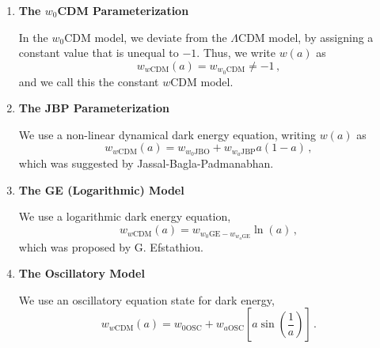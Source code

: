 \documentclass{book}
\begin{document}
	\begin{enumerate}
		\item \textbf{The $w_0$CDM Parameterization}
		
		In the $w_0$CDM model, we deviate from the $\Lambda$CDM model, by assigning a constant value that is unequal to $-1$. Thus, we write $w(a)$ as
		\begin{equation}
			w_{w\text{CDM}}(a)=w_{w_0\text{CDM}}\neq -1 \, ,
		\end{equation}
		and we call this the constant $w$CDM model.
		\item \textbf{The JBP Parameterization}
		
		We use a non-linear dynamical dark energy equation, writing $w(a)$ as
		\begin{equation}
			w_{w\text{CDM}}(a)=w_{w_0\text{JBO}}+w_{w_a\text{JBP}}a(1-a) \, ,
		\end{equation}
		which was suggested by Jassal-Bagla-Padmanabhan.
		\item \textbf{The GE (Logarithmic) Model}
		
		We use a logarithmic dark energy equation,
		\begin{equation}
			w_{w\text{CDM}}(a)=w_{w_0\text{GE}-w_{w_a\text{GE}}}\ln(a) \, ,
		\end{equation}
		which was proposed by G. Efstathiou.
		\item \textbf{The Oscillatory Model}
		
		We use an oscillatory equation state for dark energy,
		\begin{equation}
			w_{w\text{CDM}}(a)=w_{0\text{OSC}}+w_{a\text{OSC}}\left[ a\sin\left(\frac{1}{a}\right)\right] \, .
		\end{equation}
	\end{enumerate}
\end{document}
